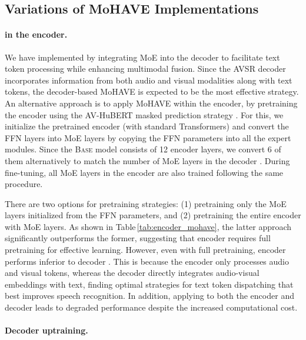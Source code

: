 


\clearpage
\subsection{Variations of MoHAVE Implementations}

\paragraph{\ourmodel in the encoder.}

We have implemented \ourmodel by integrating MoE into the decoder to facilitate text token processing while enhancing multimodal fusion. Since the AVSR decoder incorporates information from both audio and visual modalities along with text tokens, the decoder-based MoHAVE is expected to be the most effective strategy. An alternative approach is to apply MoHAVE within the encoder, by pretraining the encoder using the AV-HuBERT masked prediction strategy \cite{shi2022learning}. For this, we initialize the pretrained encoder (with standard Transformers) and convert the FFN layers into MoE layers by copying the FFN parameters into all the expert modules. Since the \textsc{Base} model consists of 12 encoder layers, we convert 6 of them alternatively to match the number of MoE layers in the decoder \ourmodel. During fine-tuning, all MoE layers in the encoder are also trained following the same procedure.

There are two options for pretraining strategies: (1) pretraining only the MoE layers initialized from the FFN parameters, and (2) pretraining the entire encoder with MoE layers. As shown in Table\,\ref{tab:encoder_mohave}, the latter approach significantly outperforms the former, suggesting that encoder \ourmodel requires full pretraining for effective learning.
However, even with full pretraining, encoder \ourmodel performs inferior to decoder \ourmodel. This is because the encoder only processes audio and visual tokens, whereas the decoder directly integrates audio-visual embeddings with text, finding optimal strategies for text token dispatching that best improves speech recognition. In addition, applying \ourmodel to both the encoder and decoder leads to degraded performance despite the increased computational cost.

\vspace{-8pt}
\paragraph{Decoder uptraining.}

